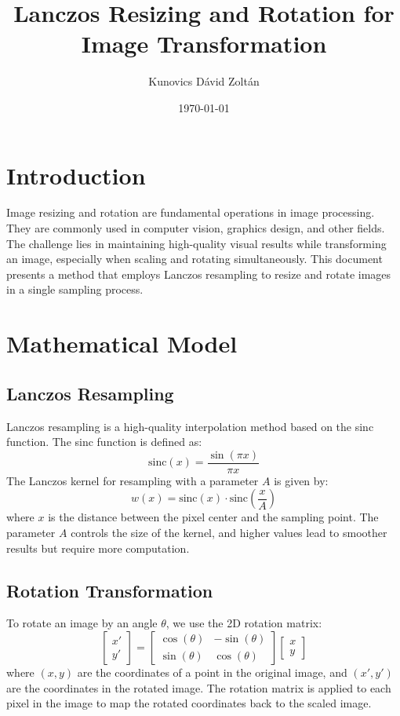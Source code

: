 \documentclass{article}
\title{Lanczos Resizing and Rotation for Image Transformation}
\author{Kunovics Dávid Zoltán}
\date{\today}
\begin{document}
\maketitle

\section{Introduction}
Image resizing and rotation are fundamental operations in image processing. They are commonly used in computer vision, graphics design, and other fields. The challenge lies in maintaining high-quality visual results while transforming an image, especially when scaling and rotating simultaneously. This document presents a method that employs Lanczos resampling to resize and rotate images in a single sampling process.

\section{Mathematical Model}

\subsection{Lanczos Resampling}
Lanczos resampling is a high-quality interpolation method based on the sinc function. The sinc function is defined as:
\[
\text{sinc}(x) = \frac{\sin(\pi x)}{\pi x}
\]
The Lanczos kernel for resampling with a parameter \(A\) is given by:
\[
w(x) = \text{sinc}(x) \cdot \text{sinc}\left(\frac{x}{A}\right)
\]
where \(x\) is the distance between the pixel center and the sampling point. The parameter \(A\) controls the size of the kernel, and higher values lead to smoother results but require more computation.

\subsection{Rotation Transformation}
To rotate an image by an angle \(\theta\), we use the 2D rotation matrix:
\[
\begin{bmatrix}
x' \\
y'
\end{bmatrix}
= 
\begin{bmatrix}
\cos(\theta) & -\sin(\theta) \\
\sin(\theta) & \cos(\theta)
\end{bmatrix}
\begin{bmatrix}
x \\
y
\end{bmatrix}
\]
where \((x, y)\) are the coordinates of a point in the original image, and \((x', y')\) are the coordinates in the rotated image. The rotation matrix is applied to each pixel in the image to map the rotated coordinates back to the scaled image.
\end{document}
